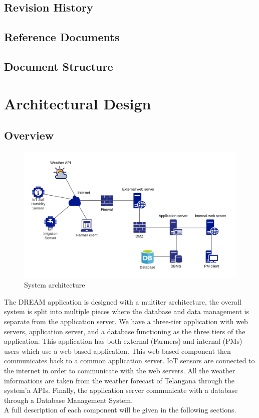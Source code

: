 \documentclass[10pt]{article} %
\begin{document}
\subsection{Revision History}
\subsection{Reference Documents}
\subsection{Document Structure}
\section{Architectural Design}
\subsection{Overview}
\begin{figure}[h]
    \centering
    \includegraphics{images/overview_architecture.png}
    \caption{System architecture}
    \label{fig:overview}
\end{figure}
The DREAM application is designed with a multiter architecture, the overall system is split into multiple pieces where 
the database and data management is separate from the application server. We have a three-tier application with web servers, 
application server, and a database functioning as the three tiers of the application.
This application has both external (Farmers) and internal (PMs) users which use a web-based application.
This web-based component then communicates back to a common application server. IoT sensors are connected to the internet in order to
communicate with the web servers. All the weather informations are taken from the weather forecast of Telangana through the system'a APIs.
Finally, the application server communicate with a database through a Database Management System.\\
A full description of each component will be given in the following sections.
\end{document}
